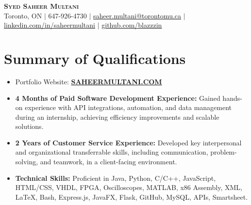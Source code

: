 \documentclass[letterpaper,11pt]{article}
\newcommand{\resumeItem}[1]{
  \item\small{
    {#1 \vspace{-2pt}}
  }
}
\newcommand{\resumeSubHeadingListStart}{\begin{itemize}[leftmargin=0.15in, label={}]}
\newcommand{\resumeSubHeadingListEnd}{\end{itemize}}
\newcommand{\resumeItemListStart}{\begin{itemize}}
\newcommand{\resumeItemListEnd}{\end{itemize}\vspace{-5pt}}
\begin{document}

\begin{center}
    \textbf{\Huge \scshape Syed Saheer Multani} \\ \vspace{1pt}
    \small Toronto, ON $|$ \small 647-926-4730 $|$ \href{mailto:saheer.multani@torontomu.ca}{\small{saheer.multani@torontomu.ca}} $|$ 
    \href{https://linkedin.com/in/saheermultani}
    {\underline{linkedin.com/in/saheermultani}} $|$
    \href{https://github.com/blazzzin}
    {\underline{github.com/blazzzin}}
\end{center}

\section{Summary of Qualifications}
  \resumeSubHeadingListStart
    \resumeItemListStart
        \resumeItem{Portfolio Website: \href{https://saheermultani.com}{{\textbf{SAHEERMULTANI.COM}}}}
        \resumeItem{\textbf{4 Months of Paid Software Development Experience:} Gained hands-on experience with API integrations, automation, and data management during an internship, achieving efficiency improvements and scalable solutions.}
        \resumeItem{\textbf{2 Years of Customer Service Experience:} Developed key interpersonal and organizational transferrable skills, including communication, problem-solving, and teamwork, in a client-facing environment.}
        \resumeItem{\textbf{Technical Skills:} Proficient in Java, Python, C/C++, JavaScript, HTML/CSS, VHDL, FPGA, Oscilloscopes, MATLAB, x86 Assembly, XML, LaTeX, Bash, Express.js, JavaFX, Flask, GitHub, MySQL, APIs, Smartsheet.}
    \resumeItemListEnd
  \resumeSubHeadingListEnd
\end{document}
